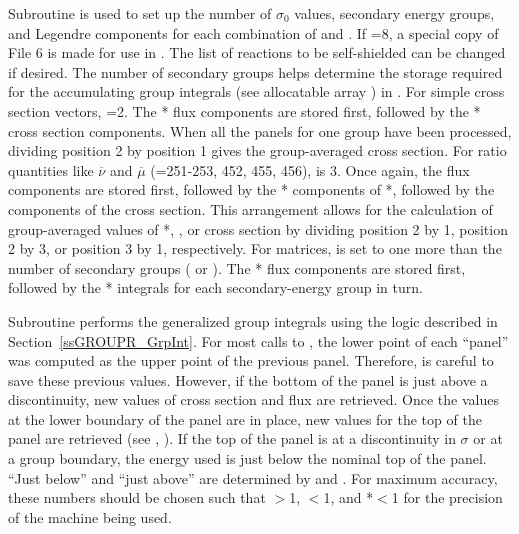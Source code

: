 Subroutine  is used to set up
the number of $\sigma_0$ values, secondary energy groups, and
Legendre components for each combination of  and
. If =8, a special copy of File 6 is
made for use in .  The
list of reactions to be self-shielded can be changed if desired.
The number of secondary groups  helps determine the
storage required for the accumulating group integrals (see
allocatable array ) in .  For simple
cross section vectors, =2.  The * flux
components are stored first, followed by the * cross
section components.  When all the panels for one group have been
processed, dividing position 2 by position 1 gives
the group-averaged cross section.  For ratio quantities like
$\overline\nu$ and $\overline\mu$ (=251-253, 452, 455, 456),
 is 3.  Once again, the flux components are stored first,
followed by the * components of *,
followed by the components of the cross section.  This arrangement
allows for the calculation of group-averaged values
of *,
, or cross section by dividing position 2 by 1, position
2 by 3, or position 3 by 1, respectively.  For matrices,  is
set to one more than the number of secondary groups ( or
).  The * flux components are stored first,
followed by the * integrals for each secondary-energy group
in turn.

Subroutine  performs the
generalized group integrals using the logic described in
Section~\ref{ssGROUPR_GrpInt}.
For most calls to , the lower point of each ``panel''
was computed as the upper point of the previous panel.  Therefore,
 is careful to save these previous values.  However,
if the bottom of the panel is just above a discontinuity, new values
of cross section and flux are retrieved.  Once the values at the
lower boundary of the panel are in place, new values for the
top of the panel are retrieved (see , ).
If the top of the panel is at a discontinuity in $\sigma$ or at a group
boundary, the energy used is just below the nominal top of the panel.
``Just below'' and ``just above'' are determined by  and
.  For maximum accuracy, these numbers should be chosen such
that $>$1, $<$1, and
*$<$1 for the
precision of the machine being used.

